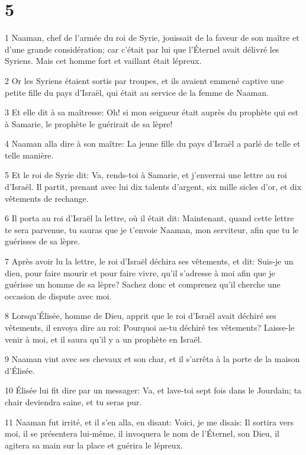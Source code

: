 \chapter{5}

\par 1 Naaman, chef de l'armée du roi de Syrie, jouissait de la faveur de son maître et d'une grande considération; car c'était par lui que l'Éternel avait délivré les Syriens. Mais cet homme fort et vaillant était lépreux.
\par 2 Or les Syriens étaient sortis par troupes, et ils avaient emmené captive une petite fille du pays d'Israël, qui était au service de la femme de Naaman.
\par 3 Et elle dit à sa maîtresse: Oh! si mon seigneur était auprès du prophète qui est à Samarie, le prophète le guérirait de sa lèpre!
\par 4 Naaman alla dire à son maître: La jeune fille du pays d'Israël a parlé de telle et telle manière.
\par 5 Et le roi de Syrie dit: Va, rends-toi à Samarie, et j'enverrai une lettre au roi d'Israël. Il partit, prenant avec lui dix talents d'argent, six mille sicles d'or, et dix vêtements de rechange.
\par 6 Il porta au roi d'Israël la lettre, où il était dit: Maintenant, quand cette lettre te sera parvenue, tu sauras que je t'envoie Naaman, mon serviteur, afin que tu le guérisses de sa lèpre.
\par 7 Après avoir lu la lettre, le roi d'Israël déchira ses vêtements, et dit: Suis-je un dieu, pour faire mourir et pour faire vivre, qu'il s'adresse à moi afin que je guérisse un homme de sa lèpre? Sachez donc et comprenez qu'il cherche une occasion de dispute avec moi.
\par 8 Lorsqu'Élisée, homme de Dieu, apprit que le roi d'Israël avait déchiré ses vêtements, il envoya dire au roi: Pourquoi as-tu déchiré tes vêtements? Laisse-le venir à moi, et il saura qu'il y a un prophète en Israël.
\par 9 Naaman vint avec ses chevaux et son char, et il s'arrêta à la porte de la maison d'Élisée.
\par 10 Élisée lui fit dire par un messager: Va, et lave-toi sept fois dans le Jourdain; ta chair deviendra saine, et tu seras pur.
\par 11 Naaman fut irrité, et il s'en alla, en disant: Voici, je me disais: Il sortira vers moi, il se présentera lui-même, il invoquera le nom de l'Éternel, son Dieu, il agitera sa main sur la place et guérira le lépreux.
